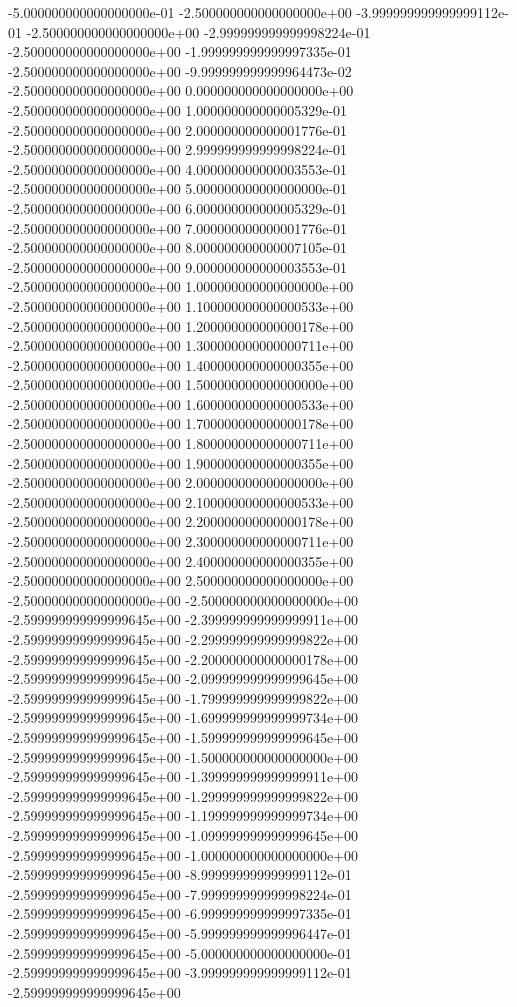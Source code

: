 -5.000000000000000000e-01 -2.500000000000000000e+00
-3.999999999999999112e-01 -2.500000000000000000e+00
-2.999999999999998224e-01 -2.500000000000000000e+00
-1.999999999999997335e-01 -2.500000000000000000e+00
-9.999999999999964473e-02 -2.500000000000000000e+00
0.000000000000000000e+00 -2.500000000000000000e+00
1.000000000000005329e-01 -2.500000000000000000e+00
2.000000000000001776e-01 -2.500000000000000000e+00
2.999999999999998224e-01 -2.500000000000000000e+00
4.000000000000003553e-01 -2.500000000000000000e+00
5.000000000000000000e-01 -2.500000000000000000e+00
6.000000000000005329e-01 -2.500000000000000000e+00
7.000000000000001776e-01 -2.500000000000000000e+00
8.000000000000007105e-01 -2.500000000000000000e+00
9.000000000000003553e-01 -2.500000000000000000e+00
1.000000000000000000e+00 -2.500000000000000000e+00
1.100000000000000533e+00 -2.500000000000000000e+00
1.200000000000000178e+00 -2.500000000000000000e+00
1.300000000000000711e+00 -2.500000000000000000e+00
1.400000000000000355e+00 -2.500000000000000000e+00
1.500000000000000000e+00 -2.500000000000000000e+00
1.600000000000000533e+00 -2.500000000000000000e+00
1.700000000000000178e+00 -2.500000000000000000e+00
1.800000000000000711e+00 -2.500000000000000000e+00
1.900000000000000355e+00 -2.500000000000000000e+00
2.000000000000000000e+00 -2.500000000000000000e+00
2.100000000000000533e+00 -2.500000000000000000e+00
2.200000000000000178e+00 -2.500000000000000000e+00
2.300000000000000711e+00 -2.500000000000000000e+00
2.400000000000000355e+00 -2.500000000000000000e+00
2.500000000000000000e+00 -2.500000000000000000e+00
-2.500000000000000000e+00 -2.599999999999999645e+00
-2.399999999999999911e+00 -2.599999999999999645e+00
-2.299999999999999822e+00 -2.599999999999999645e+00
-2.200000000000000178e+00 -2.599999999999999645e+00
-2.099999999999999645e+00 -2.599999999999999645e+00
-1.799999999999999822e+00 -2.599999999999999645e+00
-1.699999999999999734e+00 -2.599999999999999645e+00
-1.599999999999999645e+00 -2.599999999999999645e+00
-1.500000000000000000e+00 -2.599999999999999645e+00
-1.399999999999999911e+00 -2.599999999999999645e+00
-1.299999999999999822e+00 -2.599999999999999645e+00
-1.199999999999999734e+00 -2.599999999999999645e+00
-1.099999999999999645e+00 -2.599999999999999645e+00
-1.000000000000000000e+00 -2.599999999999999645e+00
-8.999999999999999112e-01 -2.599999999999999645e+00
-7.999999999999998224e-01 -2.599999999999999645e+00
-6.999999999999997335e-01 -2.599999999999999645e+00
-5.999999999999996447e-01 -2.599999999999999645e+00
-5.000000000000000000e-01 -2.599999999999999645e+00
-3.999999999999999112e-01 -2.599999999999999645e+00

